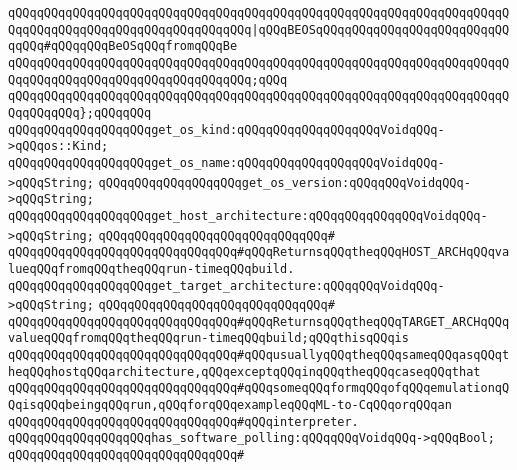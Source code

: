 \verb|qQQqqQQqqQQqqQQqqQQqqQQqqQQqqQQqqQQqqQQqqQQqqQQqqQQqqQQqqQQqqQQqqQQqqQQqqQQqqQQqqQQqqQQqqQQqqQQqqQQqqQQq|\verb#|qQQqBEOSqQQqqQQqqQQqqQQqqQQqqQQqqQQqqQQq#\verb|#qQQqqQQqBeOSqQQqfromqQQqBe|\newline
\verb|qQQqqQQqqQQqqQQqqQQqqQQqqQQqqQQqqQQqqQQqqQQqqQQqqQQqqQQqqQQqqQQqqQQqqQQqqQQqqQQqqQQqqQQqqQQqqQQqqQQqqQQq;qQQq|\newline
\verb|qQQqqQQqqQQqqQQqqQQqqQQqqQQqqQQqqQQqqQQqqQQqqQQqqQQqqQQqqQQqqQQqqQQqqQQqqQQqqQQq};qQQqqQQq|\newline
\newline
\verb|qQQqqQQqqQQqqQQqqQQqget_os_kind:qQQqqQQqqQQqqQQqqQQqVoidqQQq->qQQqos::Kind;|\newline
\verb|qQQqqQQqqQQqqQQqqQQqget_os_name:qQQqqQQqqQQqqQQqqQQqVoidqQQq->qQQqString;|\newline
\verb|qQQqqQQqqQQqqQQqqQQqget_os_version:qQQqqQQqVoidqQQq->qQQqString;|\newline
\newline
\verb|qQQqqQQqqQQqqQQqqQQqget_host_architecture:qQQqqQQqqQQqqQQqVoidqQQq->qQQqString;|\newline
\verb|qQQqqQQqqQQqqQQqqQQqqQQqqQQqqQQq#|\newline
\verb|qQQqqQQqqQQqqQQqqQQqqQQqqQQqqQQq#qQQqReturnsqQQqtheqQQqHOST_ARCHqQQqvalueqQQqfromqQQqtheqQQqrun-timeqQQqbuild.|\newline
\newline
\verb|qQQqqQQqqQQqqQQqqQQqget_target_architecture:qQQqqQQqVoidqQQq->qQQqString;|\newline
\verb|qQQqqQQqqQQqqQQqqQQqqQQqqQQqqQQq#|\newline
\verb|qQQqqQQqqQQqqQQqqQQqqQQqqQQqqQQq#qQQqReturnsqQQqtheqQQqTARGET_ARCHqQQqvalueqQQqfromqQQqtheqQQqrun-timeqQQqbuild;qQQqthisqQQqis|\newline
\verb|qQQqqQQqqQQqqQQqqQQqqQQqqQQqqQQq#qQQqusuallyqQQqtheqQQqsameqQQqasqQQqtheqQQqhostqQQqarchitecture,qQQqexceptqQQqinqQQqtheqQQqcaseqQQqthat|\newline
\verb|qQQqqQQqqQQqqQQqqQQqqQQqqQQqqQQq#qQQqsomeqQQqformqQQqofqQQqemulationqQQqisqQQqbeingqQQqrun,qQQqforqQQqexampleqQQqML-to-CqQQqorqQQqan|\newline
\verb|qQQqqQQqqQQqqQQqqQQqqQQqqQQqqQQq#qQQqinterpreter.|\newline
\newline
\newline
\verb|qQQqqQQqqQQqqQQqqQQqhas_software_polling:qQQqqQQqVoidqQQq->qQQqBool;|\newline
\verb|qQQqqQQqqQQqqQQqqQQqqQQqqQQqqQQq#|\newline
